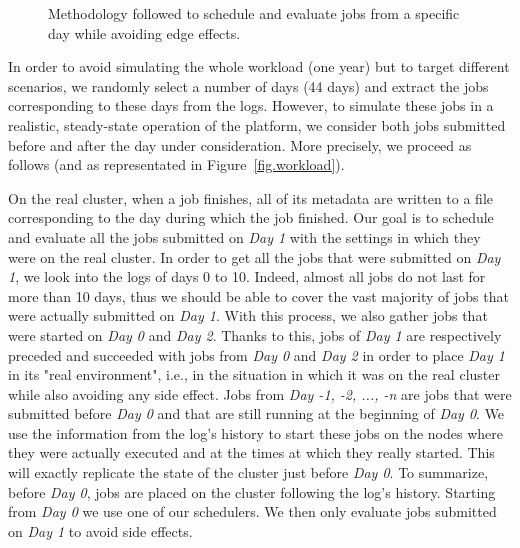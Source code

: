 \documentclass[conference,10pt]{IEEEtran}
\begin{document}
\begin{figure}[tb]
{
}
\caption{Methodology followed to schedule and evaluate jobs from a specific day while avoiding edge effects.}\label{fig.workload}
\label{fig.ex}
\end{figure}

In order to avoid simulating the whole workload (one year) but to
target different scenarios, we randomly select a number of days (44 days) and
extract the jobs corresponding to these days from the logs. However,
to simulate these jobs in a realistic, steady-state operation of the
platform, we consider both jobs submitted before and after the day
under consideration. More precisely, we proceed as follows (and as
representated in Figure~\ref{fig.workload}).


On the real cluster, when a job finishes, all of its metadata
are written to a file corresponding to the day during which the job finished.
Our goal is to schedule and evaluate all the jobs submitted on 
\textit{Day 1} with the settings in which they were on the real cluster.
In order to get all the jobs that were submitted on \textit{Day 1}, we
look into the logs of days 0 to 10. Indeed, almost all jobs do not last for more than 10 days,
thus we should be able to cover the vast majority of jobs that were actually submitted on 
\textit{Day 1}.
With this process, we also gather jobs that were started on \textit{Day 0} and \textit{Day 2}. 
Thanks to this, jobs of \textit{Day 1} are respectively preceded and succeeded with jobs from \textit{Day 0}
and \textit{Day 2} in order to place \textit{Day 1} in its "real environment",
i.e., in the situation in which it was on the real cluster while also avoiding any side effect.
Jobs from \textit{Day -1, -2, ..., -n} are jobs that were submitted before \textit{Day 0} and that are still running at the beginning of \textit{Day 0}.
We use the information from the log's history to start these jobs on the nodes
where they were actually executed and at the times at which they really started.
This will exactly replicate the state of the cluster just before \textit{Day 0}.
To summarize, before \textit{Day 0}, jobs are placed on the cluster
following the log's history. Starting from \textit{Day 0} we 
use one of our schedulers. We then only evaluate jobs submitted on \textit{Day 1}
to avoid side effects.
\end{document}

